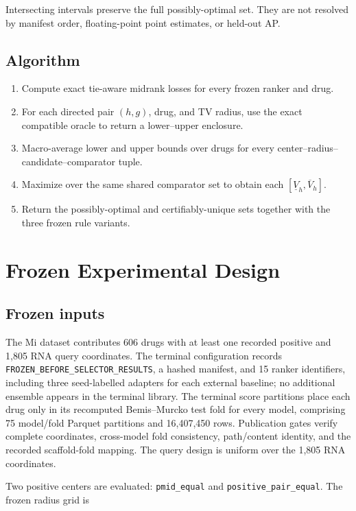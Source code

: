 \documentclass[preprint,review,12pt]{elsarticle}
\begin{document}
Intersecting intervals preserve the full possibly-optimal set. They are not
resolved by manifest order, floating-point point estimates, or held-out AP.

\subsection{Algorithm}

\begin{enumerate}[leftmargin=*]
  \item Compute exact tie-aware midrank losses for every frozen ranker and drug.
  \item For each directed pair \((h,g)\), drug, and TV radius, use the exact
  compatible oracle to return a lower--upper enclosure.
  \item Macro-average lower and upper bounds over drugs for every
  center--radius--candidate--comparator tuple.
  \item Maximize over the same shared comparator set to obtain each
  \([\underline V_h,\overline V_h]\).
  \item Return the possibly-optimal and certifiably-unique sets together with
  the three frozen rule variants.
\end{enumerate}

\section{Frozen Experimental Design}

\subsection{Frozen inputs}

The Mi dataset contributes 606 drugs with at least one recorded positive and
1,805 RNA query coordinates. The terminal configuration records
\texttt{FROZEN\_BEFORE\_SELECTOR\_RESULTS}, a hashed manifest, and 15 ranker
identifiers, including three seed-labelled adapters for each external
baseline; no additional ensemble appears in the terminal library. The terminal
score partitions place each drug only in its recomputed Bemis--Murcko test fold
for every model, comprising 75 model/fold Parquet partitions and 16,407,450
rows. Publication gates verify complete coordinates, cross-model fold
consistency, path/content identity, and the recorded scaffold-fold mapping.
The query design is uniform over the 1,805 RNA coordinates.

Two positive centers are evaluated: \nolinkurl{pmid_equal} and
\nolinkurl{positive_pair_equal}. The frozen radius grid is
\end{document}
